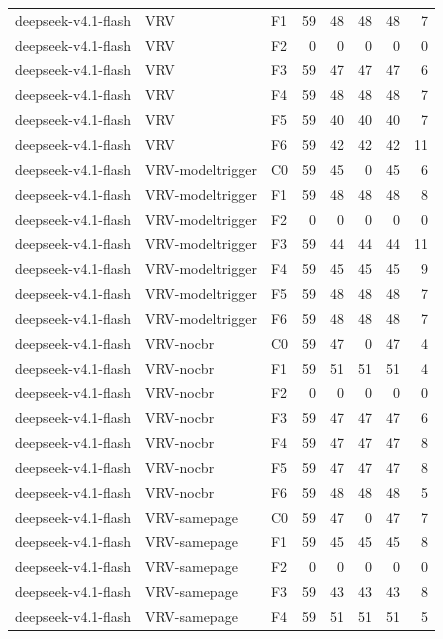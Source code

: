\begin{tabular}{lllrrrrr}
deepseek-v4.1-flash & VRV & F1 & 59 & 48 & 48 & 48 & 7 \\
deepseek-v4.1-flash & VRV & F2 & 0 & 0 & 0 & 0 & 0 \\
deepseek-v4.1-flash & VRV & F3 & 59 & 47 & 47 & 47 & 6 \\
deepseek-v4.1-flash & VRV & F4 & 59 & 48 & 48 & 48 & 7 \\
deepseek-v4.1-flash & VRV & F5 & 59 & 40 & 40 & 40 & 7 \\
deepseek-v4.1-flash & VRV & F6 & 59 & 42 & 42 & 42 & 11 \\
deepseek-v4.1-flash & VRV-modeltrigger & C0 & 59 & 45 & 0 & 45 & 6 \\
deepseek-v4.1-flash & VRV-modeltrigger & F1 & 59 & 48 & 48 & 48 & 8 \\
deepseek-v4.1-flash & VRV-modeltrigger & F2 & 0 & 0 & 0 & 0 & 0 \\
deepseek-v4.1-flash & VRV-modeltrigger & F3 & 59 & 44 & 44 & 44 & 11 \\
deepseek-v4.1-flash & VRV-modeltrigger & F4 & 59 & 45 & 45 & 45 & 9 \\
deepseek-v4.1-flash & VRV-modeltrigger & F5 & 59 & 48 & 48 & 48 & 7 \\
deepseek-v4.1-flash & VRV-modeltrigger & F6 & 59 & 48 & 48 & 48 & 7 \\
deepseek-v4.1-flash & VRV-nocbr & C0 & 59 & 47 & 0 & 47 & 4 \\
deepseek-v4.1-flash & VRV-nocbr & F1 & 59 & 51 & 51 & 51 & 4 \\
deepseek-v4.1-flash & VRV-nocbr & F2 & 0 & 0 & 0 & 0 & 0 \\
deepseek-v4.1-flash & VRV-nocbr & F3 & 59 & 47 & 47 & 47 & 6 \\
deepseek-v4.1-flash & VRV-nocbr & F4 & 59 & 47 & 47 & 47 & 8 \\
deepseek-v4.1-flash & VRV-nocbr & F5 & 59 & 47 & 47 & 47 & 8 \\
deepseek-v4.1-flash & VRV-nocbr & F6 & 59 & 48 & 48 & 48 & 5 \\
deepseek-v4.1-flash & VRV-samepage & C0 & 59 & 47 & 0 & 47 & 7 \\
deepseek-v4.1-flash & VRV-samepage & F1 & 59 & 45 & 45 & 45 & 8 \\
deepseek-v4.1-flash & VRV-samepage & F2 & 0 & 0 & 0 & 0 & 0 \\
deepseek-v4.1-flash & VRV-samepage & F3 & 59 & 43 & 43 & 43 & 8 \\
deepseek-v4.1-flash & VRV-samepage & F4 & 59 & 51 & 51 & 51 & 5 \\

\end{tabular}
